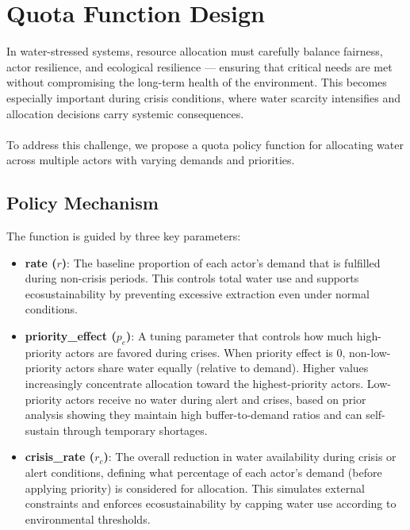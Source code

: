 \documentclass[a4paper, 12pt]{article}
\begin{document}
\section{Quota Function Design}
In water-stressed systems, resource allocation must carefully balance fairness, actor resilience, and 
ecological resilience — ensuring that critical needs are met without compromising the long-term health 
of the environment. This becomes especially important during crisis conditions, where water scarcity 
intensifies and allocation decisions carry systemic consequences.
\\ \\
\noindent To address this challenge, we propose a quota policy function for allocating water across multiple actors 
with varying demands and priorities. 

\subsection{Policy Mechanism}
The function is guided by three key parameters:

\begin{itemize}
    \item \textbf{rate ($r$)}: The baseline proportion of each actor's demand that is fulfilled during non-crisis periods. 
    This controls total water use and supports ecosustainability by preventing excessive extraction even under normal conditions.
    \item \textbf{priority\_effect ($p_e$)}: A tuning parameter that controls how much high-priority actors are favored during crises.
    When priority effect is 0, non-low-priority actors share water equally (relative to demand). Higher values increasingly concentrate 
    allocation toward the highest-priority actors. Low-priority actors receive no water during alert and crises, based on prior analysis 
    showing they maintain high buffer-to-demand ratios and can self-sustain through temporary shortages.
    \item \textbf{crisis\_rate ($r_c$)}: The overall reduction in water availability during crisis or alert conditions, defining what 
    percentage of each actor’s demand (before applying priority) is considered for allocation. This simulates external constraints and enforces 
    ecosustainability by capping water use according to environmental thresholds.
\end{itemize}  
\end{document}
